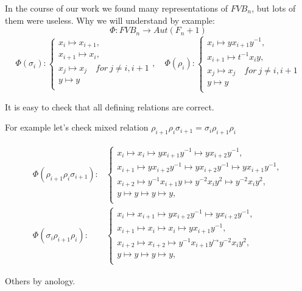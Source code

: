 \documentclass{article}
\begin{document}
\vspace{6pt}In the course of our work we found many representations of $FVB_n$, but lots of them were useless. Why we will understand by example:
$$\Phi : FVB_n \to Aut(F_n+1)$$
$$
\Phi(\sigma_i):
\begin{cases}
x_i \mapsto x_{i+1},\\
x_{i+1} \mapsto x_i,\\
x_j \mapsto x_j \quad for~j \not= i, i+1 \\
y \mapsto y \\
\end{cases},\quad
\Phi(\rho_i):
\begin{cases}
x_i \mapsto yx_{i+1}y^{-1},\\
x_{i+1} \mapsto t^{-1}x_iy,\\
x_j \mapsto x_j \quad for~j \not= i, i+1 \\
y \mapsto y \\
\end{cases}
$$

It is easy to check that all defining relations are correct.

For example let's check mixed relation $\rho_{i+1}\rho_i\sigma_{i+1} = \sigma_i\rho_{i+1}\rho_i$

\begin{align*}
\Phi(\rho_{i+1}\rho_i\sigma_{i+1}):&
\begin{cases}
x_i \mapsto x_i \mapsto yx_{i+1}y^{-1} \mapsto yx_{i+2}y^{-1},\\
x_{i+1} \mapsto yx_{i+2}y^{-1} \mapsto yx_{i+2}y^{-1} \mapsto yx_{i+1}y^{-1},\\
x_{i+2} \mapsto y^{-1}x_{i+1}y \mapsto y^{-2}x_iy^2 \mapsto y^{-2}x_iy^2,\\
y \mapsto y\mapsto y \mapsto y, \\
\end{cases} \\
\Phi(\sigma_i\rho_{i+1}\rho_i):&
\begin{cases}
x_i \mapsto x_{i+1} \mapsto yx_{i+2}y^{-1} \mapsto yx_{i+2}y^{-1},\\
x_{i+1} \mapsto x_i \mapsto x_i \mapsto yx_{i+1}y^{-1},\\
x_{i+2} \mapsto x_{i+2} \mapsto y^{-1}x_{i+1}y^ \mapsto y^{-2}x_iy^2,\\
y \mapsto y\mapsto y \mapsto y, \\
\end{cases}
\end{align*}

Others by anology.
\end{document}
